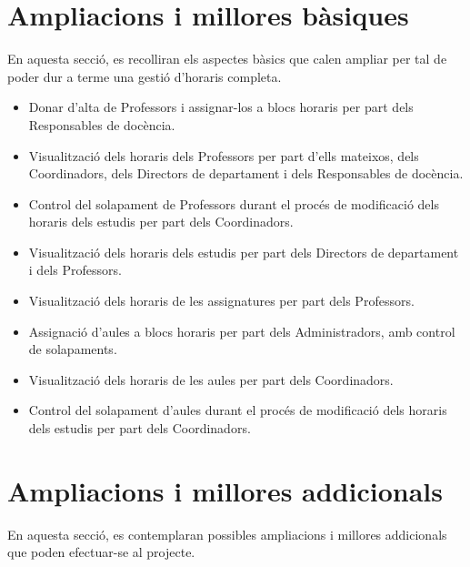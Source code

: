 \documentclass[a4paper,12pt]{ThesisStyle}
\begin{document}
\section{Ampliacions i millores bàsiques}
\label{sec:ampliacions_basiques}

En aquesta secció, es recolliran els aspectes bàsics que calen ampliar per tal de poder dur a terme una gestió d'horaris completa.

\begin{itemize}
  \item Donar d'alta de Professors i assignar-los a blocs horaris per part dels Responsables de docència.
  \item Visualització dels horaris dels Professors per part d'ells mateixos, dels Coordinadors, dels Directors de departament i dels Responsables de docència.
  \item Control del solapament de Professors durant el procés de modificació dels horaris dels estudis per part dels Coordinadors.
  \item Visualització dels horaris dels estudis per part dels Directors de departament i dels Professors.
  \item Visualització dels horaris de les assignatures per part dels Professors.
  \item Assignació d'aules a blocs horaris per part dels Administradors, amb control de solapaments.
  \item Visualització dels horaris de les aules per part dels Coordinadors.
  \item Control del solapament d'aules durant el procés de modificació dels horaris dels estudis per part dels Coordinadors.
\end{itemize}

\section{Ampliacions i millores addicionals}
\label{sec:ampliacions_addicionals}

En aquesta secció, es contemplaran possibles ampliacions i millores addicionals que poden efectuar-se al projecte.
\end{document}
